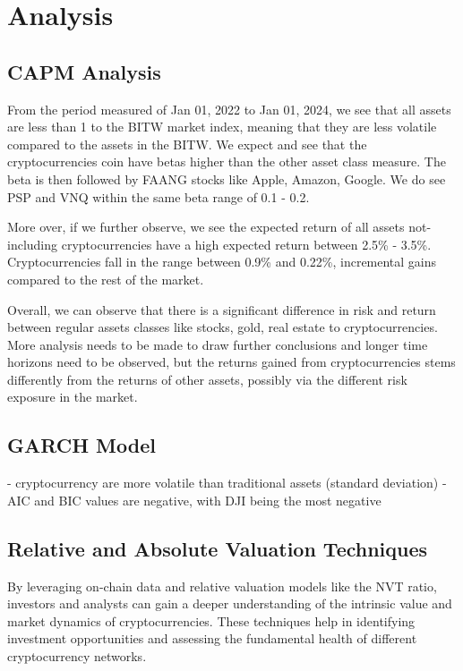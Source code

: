 \section{Analysis}
\subsection{CAPM Analysis}

From the period measured of Jan 01, 2022 to Jan 01, 2024, we see that all assets are less than 1 to the BITW market index, meaning that they are less volatile compared to the assets in the BITW. We expect and see that the cryptocurrencies coin have betas higher than the other asset class measure. The beta is then followed by FAANG stocks like Apple, Amazon, Google. We do see PSP and VNQ within the same beta range of 0.1 - 0.2. 

More over, if we further observe, we see the expected return of all assets not-including cryptocurrencies have a high expected return between 2.5\% - 3.5\%. Cryptocurrencies fall in the range between 0.9\% and 0.22\%, incremental gains compared to the rest of the market.

Overall, we can observe that there is a significant difference in risk and return between regular assets classes like stocks, gold, real estate to cryptocurrencies. More analysis needs to be made to draw further conclusions and longer time horizons need to be observed, but the returns gained from cryptocurrencies stems differently from the returns of other assets, possibly via the different risk exposure in the market.

\subsection{GARCH Model}

- cryptocurrency are more volatile than traditional assets (standard deviation)
- AIC and BIC values are negative, with DJI being the most negative

\subsection{Relative and Absolute Valuation Techniques}

By leveraging on-chain data and relative valuation models like the NVT ratio, investors and analysts can gain a deeper understanding of the intrinsic value and market dynamics of cryptocurrencies. These techniques help in identifying investment opportunities and assessing the fundamental health of different cryptocurrency networks.

